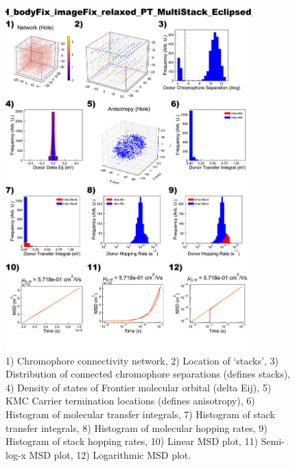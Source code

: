 \documentclass[12pt]{article}
\begin{document}
\begin{figure}[h]\centering
	\includegraphics[width=0.85\textwidth]{Figures/VRH_bodyFix_imageFix_relaxed_PT_MultiStack_Eclipsed_AA.png}
    \caption{   1) Chromophore connectivity network, 
                2) Location of `stacks', 
                3) Distribution of connected chromophore separations (defines stacks),
                4) Density of states of Frontier molecular orbital (delta Eij),
                5) KMC Carrier termination locations (defines anisotropy),
                6) Histogram of molecular transfer integrals,
                7) Histogram of stack transfer integrals,
                8) Histogram of molecular hopping rates,
                9) Histogram of stack hopping rates,
                10) Linear MSD plot,
                11) Semi-log-x MSD plot,
                12) Logarithmic MSD plot.}
	\label{fig:VRHPTMultEcl}
\end{figure}
\end{document}

